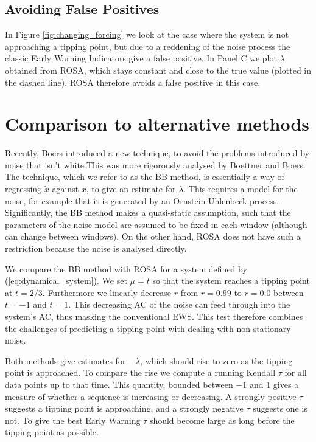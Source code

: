 \subsection{Avoiding False Positives}
In Figure \cref{fig:changing_forcing} we look at the case where the 
system is not approaching a tipping point, but due to a reddening of 
the noise process the classic Early Warning Indicators give a 
false positive. In Panel C we plot $\lambda$ obtained from ROSA, which stays constant and close to the true value (plotted in the dashed line). ROSA therefore avoids a false positive in this case.




\section{Comparison to alternative methods}
Recently, Boers\cite{Boers2021a} introduced a new technique,
to avoid the problems introduced by noise that isn't white.This was
more rigorously analysed by Boettner and Boers\cite{Boettner2022}. The
technique, which we refer to as the BB method, is essentially a way of
regressing $\dot{x}$ against $x$, to give an estimate for $\lambda$. 
This requires a model for the noise, for example that it is
generated by an Ornstein-Uhlenbeck process. Significantly, the BB method makes a quasi-static assumption, such that the parameters of the noise
model are assumed to be fixed in each window (although can change between windows). On the other hand,
ROSA does not have such a restriction because the noise is analysed directly.

We compare the BB method with ROSA for a system defined by
(\cref{eq:dynamical_system}). We set $\mu  = t$ so that the system
reaches a tipping point at $t=2/3$. Furthermore we linearly decrease
$r$ from $r=0.99$ to $r=0.0$ between $t=-1$ and $t=1$.
This decreasing AC of the
noise can feed through into the system's AC, thus masking
the conventional EWS. This test therefore
combines the challenges of predicting a tipping point with dealing
with non-stationary noise.

Both methods give estimates for $-\lambda$, which should rise
to zero as the tipping point is approached. To compare the 
rise we compute a running Kendall $\tau$\cite{Wilks2019} for all data points up to
that time. This quantity, bounded 
between $-1$ and $1$ gives a measure of whether a sequence is 
increasing or decreasing. A strongly positive $\tau$ suggests a tipping point is approaching, and a strongly negative $\tau$ suggests one is not. To give the best Early Warning $\tau$ should become
large as long before the tipping point as possible.


